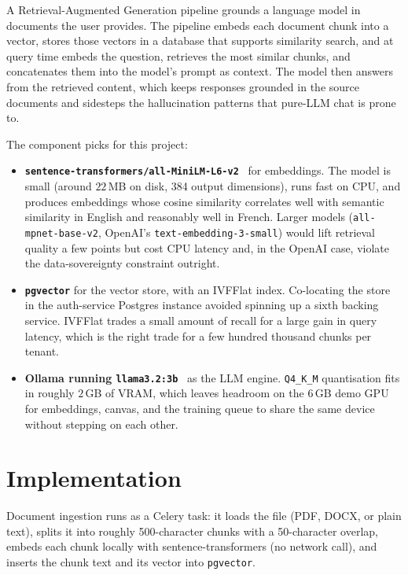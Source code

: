 \documentclass[12pt, a4paper, oneside]{report}
\begin{document}
A Retrieval-Augmented Generation pipeline grounds a language model in
documents the user provides. The pipeline embeds each document chunk
into a vector, stores those vectors in a database that supports
similarity search, and at query time embeds the question, retrieves
the most similar chunks, and concatenates them into the model's
prompt as context. The model then answers from the retrieved
content, which keeps responses grounded in the source documents and
sidesteps the hallucination patterns that pure-LLM chat is prone to.

The component picks for this project:

\begin{itemize}
    \item \textbf{\texttt{sentence-transformers/all-MiniLM-L6-v2}}~\cite{minilm}
        for embeddings. The model is small (around $22$\,MB on
        disk, 384 output dimensions), runs fast on CPU, and produces
        embeddings whose cosine similarity correlates well with
        semantic similarity in English and reasonably well in French.
        Larger models (\texttt{all-mpnet-base-v2}, OpenAI's
        \texttt{text-embedding-3-small}) would lift retrieval quality
        a few points but cost CPU latency and, in the OpenAI case,
        violate the data-sovereignty constraint outright.
    \item \textbf{\texttt{pgvector}} for the vector store, with an
        IVFFlat index. Co-locating the store in the auth-service
        Postgres instance avoided spinning up a sixth backing
        service. IVFFlat trades a small amount of recall for a
        large gain in query latency, which is the right trade for
        a few hundred thousand chunks per tenant.
    \item \textbf{Ollama running \texttt{llama3.2:3b}}~\cite{llama32} as the LLM
        engine. \texttt{Q4\_K\_M} quantisation fits in roughly
        $2$\,GB of VRAM, which leaves headroom on the 6\,GB demo GPU
        for embeddings, canvas, and the training queue to share the
        same device without stepping on each other.
\end{itemize}

\section{Implementation}

Document ingestion runs as a Celery task: it loads the file
(PDF, DOCX, or plain text), splits it into roughly 500-character chunks
with a 50-character overlap, embeds each chunk locally with
sentence-transformers (no network call), and inserts the chunk text and
its vector into \texttt{pgvector}.
\end{document}
